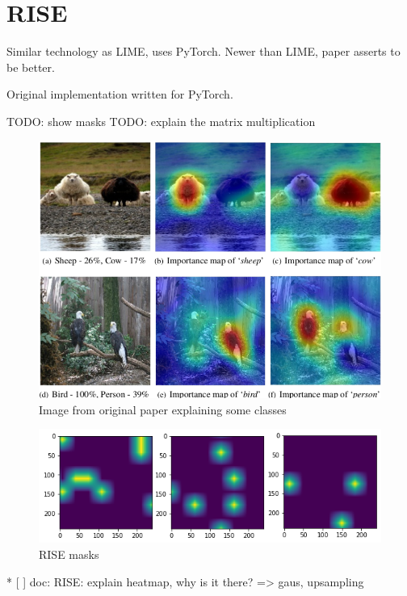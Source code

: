 \section{RISE}
Similar technology as LIME, uses PyTorch. Newer than LIME, paper asserts to be better.

Original implementation written for PyTorch.

TODO: show masks
TODO: explain the matrix multiplication

\begin{figure}[H]
\centering
\caption{Image from original paper explaining some classes}
\includegraphics[width=12cm]{chapters/02_methods/images/rise.png}
\end{figure}

\begin{figure}[H]
\centering
\caption{RISE masks}
\includegraphics[width=14cm]{chapters/02_methods/images/rise-masks.png}
\end{figure}

* [ ] doc: RISE: explain heatmap, why is it there? => gaus, upsampling

